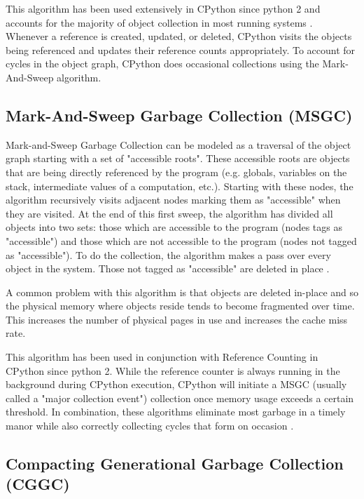 \documentclass{article}
\begin{document}
  This algorithm has been used extensively in CPython since python 2 and accounts for the majority of object collection in most running systems \cite{cpython3-doc}.  Whenever a reference is created, updated, or deleted, CPython visits the objects being referenced and updates their reference counts appropriately.  To account for cycles in the object graph, CPython does occasional collections using the Mark-And-Sweep algorithm.  

  \subsection{Mark-And-Sweep Garbage Collection (MSGC)}\label{sec:MSGC}

  Mark-and-Sweep Garbage Collection can be modeled as a traversal of the object graph starting with a set of "accessible roots".  These accessible roots are objects that are being directly referenced by the program (e.g. globals, variables on the stack, intermediate values of a computation, etc.).  Starting with these nodes, the algorithm recursively visits adjacent nodes marking them as "accessible" when they are visited.  At the end of this first sweep, the algorithm has divided all objects into two sets: those which are accessible to the program (nodes tags as "accessible") and those which are not accessible to the program (nodes not tagged as "accessible").  To do the collection, the algorithm makes a pass over every object in the system.  Those not tagged as "accessible" are deleted in place \cite{GC-continuum}. 

  A common problem with this algorithm is that objects are deleted in-place and so the physical memory where objects reside tends to become fragmented over time.  This increases the number of physical pages in use and increases the cache miss rate.  

  This algorithm has been used in conjunction with Reference Counting in CPython since python 2.  While the reference counter is always running in the background during CPython execution, CPython will initiate a MSGC (usually called a "major collection event") collection once memory usage exceeds a certain threshold.  In combination, these algorithms eliminate most garbage in a timely manor while also correctly collecting cycles that form on occasion \cite{cpython3-doc}.  

  \subsection{Compacting Generational Garbage Collection (CGGC)}\label{sec:CGGC}
\end{document}
